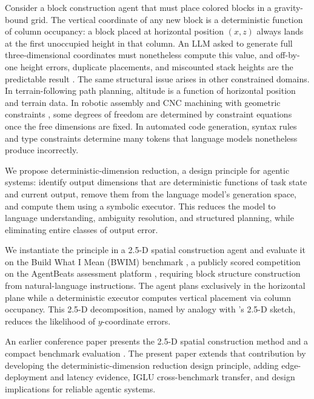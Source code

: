 \documentclass[10pt]{article}
\begin{document}
Consider a block construction agent that must place colored blocks in a
gravity-bound grid. The vertical coordinate of any new block is a
deterministic function of column occupancy: a block placed at horizontal
position $(x, z)$ always lands at the first unoccupied height in that
column. An LLM asked to generate full three-dimensional coordinates must
nonetheless compute this value, and off-by-one height errors, duplicate
placements, and miscounted stack heights are the predictable result
\parencite{yamada2024, bang2023}. The same structural issue arises in
other constrained domains. In terrain-following path planning, altitude is
a function of horizontal position and terrain data. In robotic assembly and
CNC machining with geometric constraints \parencite{held1991}, some degrees
of freedom are determined by constraint equations once the free dimensions
are fixed. In automated code
generation, syntax rules and type constraints determine many tokens that
language models nonetheless produce incorrectly.

We propose deterministic-dimension reduction, a design principle for
agentic systems: identify output dimensions that are deterministic functions
of task state and current output, remove them from the language model's
generation space, and compute them using a symbolic executor. This reduces
the model to language understanding, ambiguity resolution, and structured
planning, while eliminating entire classes of output error.

We instantiate the principle in a 2.5-D spatial construction agent and
evaluate it on the Build What I Mean (BWIM) benchmark \parencite{bwim},
a publicly scored competition on the AgentBeats assessment platform
\parencite{liu2026agentbeats}, requiring block structure construction from
natural-language instructions. The agent plans exclusively in the
horizontal plane while a deterministic executor computes vertical
placement via column occupancy. This 2.5-D decomposition, named by
analogy with \textcite{marr1982vision}'s 2.5-D sketch, reduces the likelihood
of $y$-coordinate errors.

An earlier conference paper presents the 2.5-D spatial construction
method and a compact benchmark evaluation \parencite{11674959}. The
present paper extends that contribution by developing the
deterministic-dimension reduction design principle, adding
edge-deployment and latency evidence, IGLU cross-benchmark transfer, and
design implications for reliable agentic systems.
\end{document}

